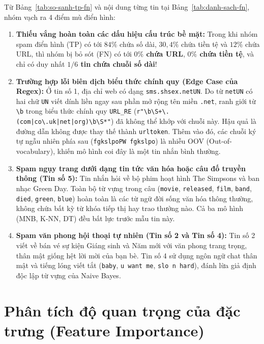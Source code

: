 Từ Bảng~\ref{tab:so-sanh-tp-fn} và nội dung từng tin tại Bảng~\ref{tab:danh-sach-fn}, nhóm vạch ra 4 điểm mù điển hình:
\begin{enumerate}
    \item \textbf{Thiếu vắng hoàn toàn các dấu hiệu cấu trúc bề mặt:}
    Trong khi nhóm spam điển hình (TP) có tới $84\%$ chứa số dài, $30,4\%$ chứa tiền tệ và $12\%$ chứa URL, thì nhóm bị bỏ sót (FN) có tới \textbf{$0\%$ chứa URL}, \textbf{$0\%$ chứa tiền tệ}, và chỉ có duy nhất \textbf{$1/6$ tin chứa chuỗi số dài}!
    \item \textbf{Trường hợp lỗi biên dịch biểu thức chính quy (Edge Case của Regex):}
    Ở tin số 1, địa chỉ web có dạng \texttt{sms.shsex.netUN}. Do từ \texttt{netUN} có hai chữ \texttt{UN} viết dính liền ngay sau phần mở rộng tên miền \texttt{.net}, ranh giới từ \texttt{\textbackslash{}b} trong biểu thức chính quy \texttt{URL\_RE} (\texttt{r"\textbackslash{}b\textbackslash{}S+\textbackslash{}.(com|co\textbackslash{}.uk|net|org)\textbackslash{}b\textbackslash{}S*"}) đã không thể khớp với chuỗi này. Hậu quả là đường dẫn không được thay thế thành \texttt{urltoken}. Thêm vào đó, các chuỗi ký tự ngẫu nhiên phía sau (\texttt{fgkslpoPW fgkslpo}) là nhiễu OOV (Out-of-vocabulary), khiến mô hình coi đây là một tin nhắn bình thường.
    \item \textbf{Spam ngụy trang dưới dạng tin tức văn hóa hoặc câu đố truyền thông (Tin số 5):}
    Tin nhắn hỏi về bộ phim hoạt hình The Simpsons và ban nhạc Green Day. Toàn bộ từ vựng trong câu (\texttt{movie}, \texttt{released}, \texttt{film}, \texttt{band}, \texttt{died}, \texttt{green}, \texttt{blue}) hoàn toàn là các từ ngữ đời sống văn hóa thông thường, không chứa bất kỳ từ khóa tiếp thị hay trao thưởng nào. Cả ba mô hình (MNB, K-NN, DT) đều bất lực trước mẫu tin này.
    \item \textbf{Spam văn phong hội thoại tự nhiên (Tin số 2 và Tin số 4):}
    Tin số 2 viết về bán vé sự kiện Giáng sinh và Năm mới với văn phong trang trọng, thân mật giống hệt lời mời của bạn bè. Tin số 4 sử dụng ngôn ngữ chat thân mật và tiếng lóng viết tắt (\texttt{baby}, \texttt{u want me}, \texttt{slo n hard}), đánh lừa giả định độc lập từ vựng của Naive Bayes.
\end{enumerate}

\section{Phân tích độ quan trọng của đặc trưng (Feature Importance)}
\label{sec:feature-importance}

